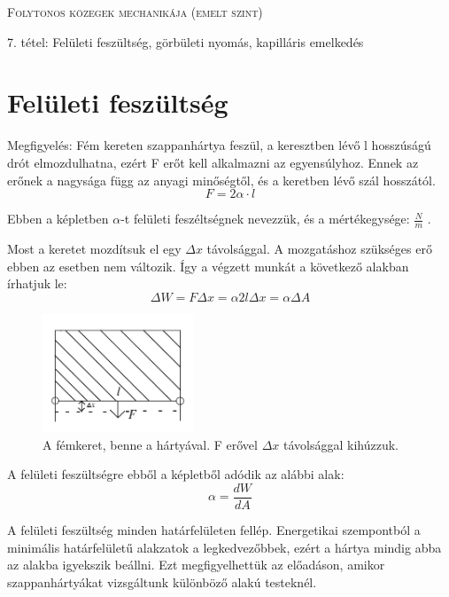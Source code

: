 \documentclass[a4paper,titlepage,12pt]{article}
\begin{document}
	\begin{centering}
		\scshape\LARGE Folytonos közegek mechanikája (emelt szint) \par
		\vspace{1cm}
		
		\large 7. tétel: Felületi feszültség, görbületi nyomás, kapilláris emelkedés
	\end{centering}
		
\part{Felületi feszültség}

Megfigyelés: Fém kereten szappanhártya feszül, a keresztben lévő l hosszúságú drót elmozdulhatna, ezért F erőt kell alkalmazni az egyensúlyhoz. Ennek az erőnek a nagysága függ az anyagi minőségtől, és a keretben lévő szál hosszától. $$ F=2\alpha\cdot l $$

\noindent
Ebben a képletben $\alpha$-t felületi feszéltségnek nevezzük, és a  mértékegysége: $ \frac{N}{m}$ . 
\vspace{0.5 cm}

\noindent
Most a keretet mozdítsuk el egy $\Delta x$ távolsággal. A mozgatáshoz szükséges erő ebben az esetben nem változik. Így a végzett munkát a következő alakban írhatjuk le: $$\Delta W=F \Delta x=\alpha 2l \Delta x = \alpha \Delta A $$ 

\begin{figure}[H]
	\begin{center}
		\includegraphics[width=0.4\textwidth]{tetel7.png}
		\caption{A fémkeret, benne a hártyával. F erővel $\Delta x $ távolsággal kihúzzuk.}
	\end{center}
\end{figure}

\noindent
A felületi feszültségre ebből a képletből adódik az alábbi alak: $$\alpha=\frac{dW}{dA}$$

\noindent
A felületi feszültség minden határfelületen fellép. Energetikai szempontból a minimális határfelületű alakzatok a legkedvezőbbek, ezért a hártya mindig abba az alakba igyekszik beállni. Ezt megfigyelhettük az előadáson, amikor szappanhártyákat vizsgáltunk különböző alakú testeknél. 
\end{document}

